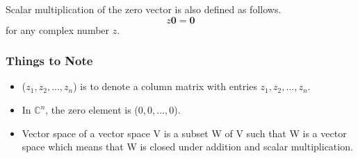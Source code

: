 \documentclass{article}
\begin{document}
Scalar multiplication of the zero vector is also defined as follows. \\
\begin{equation}
z \textbf{0} = \textbf{0}
\end{equation}
for any complex number $z$. \\
\subsubsection{Things to Note}
\begin{itemize}
\item ($z_1, z_2, ..., z_n$) is to denote a column matrix with entries $z_1, z_2, ..., z_n$.
\item In $\mathbb{C}^n$, the zero element is ($0, 0, ..., 0$).
\item Vector space of a vector space V is a subset W of V such that W is a vector space which means that W is closed under addition and scalar multiplication.
\end{itemize} 
\newpage
\end{document}
